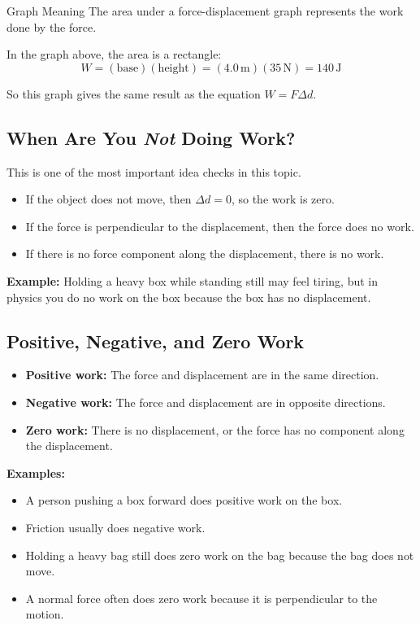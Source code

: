 \begin{keyidea}{Graph Meaning}
The area under a force-displacement graph represents the work done by the force.
\end{keyidea}

In the graph above, the area is a rectangle:
\begin{equation*}
    W = (\text{base})(\text{height}) = (4.0\,\text{m})(35\,\text{N}) = 140\,\text{J}
\end{equation*}

So this graph gives the same result as the equation $W = F\Delta d$.

\subsection{When Are You \emph{Not} Doing Work?}
This is one of the most important idea checks in this topic.

\begin{itemize}
    \item If the object does not move, then $\Delta d = 0$, so the work is zero.
    \item If the force is perpendicular to the displacement, then the force does no work.
    \item If there is no force component along the displacement, there is no work.
\end{itemize}

\textbf{Example:} Holding a heavy box while standing still may feel tiring, but in physics you do no work on the box because the box has no displacement.

\subsection{Positive, Negative, and Zero Work}
\begin{itemize}
    \item \textbf{Positive work:} The force and displacement are in the same direction.
    \item \textbf{Negative work:} The force and displacement are in opposite directions.
    \item \textbf{Zero work:} There is no displacement, or the force has no component along the displacement.
\end{itemize}

\textbf{Examples:}
\begin{itemize}
    \item A person pushing a box forward does positive work on the box.
    \item Friction usually does negative work.
    \item Holding a heavy bag still does zero work on the bag because the bag does not move.
    \item A normal force often does zero work because it is perpendicular to the motion.
\end{itemize}

